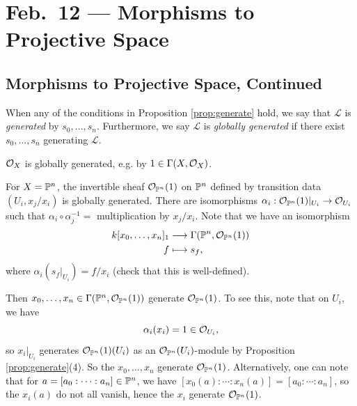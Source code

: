 \chapter{Feb.~12 --- Morphisms to Projective Space}

\section{Morphisms to Projective Space, Continued}

\begin{definition}
  When any of the conditions
  in Proposition \ref{prop:generate} hold, we say that
  $\mathcal{L}$ is \emph{generated}
  by $s_0, \dots, s_n$. Furthermore,
  we say $\mathcal{L}$
  is \emph{globally generated} if
  there exist $s_0, \dots, s_n$ generating
  $\mathcal{L}$.
\end{definition}

\begin{example}
  $\mathcal{O}_X$ is globally generated,
  e.g. by $1 \in \Gamma(X, \mathcal{O}_X)$.
\end{example}

\begin{example}
  For $X = \mathbb{P}^n$, the invertible sheaf
  $\mathcal{O}_{\mathbb{P}^n}(1)$
  on $\mathbb{P}^n$ defined by transition data
  $(U_i, x_j / x_i)$
  is globally generated. There are
  isomorphisms
  $\alpha_{i} : \mathcal{O}_{\mathbb{P}^n}(1)|_{U_i} \to \mathcal{O}_{U_i}$
  such that $\alpha_i \circ \alpha_j^{-1} =$
  multiplication by $x_j / x_i$.
  Note that we have an isomorphism
  \begin{align*}
    k[x_0, \dots, x_n]_1
    &\longrightarrow \Gamma(\mathbb{P}^n, \mathcal{O}_{\mathbb{P}^n}(1)) \\
    f &\longmapsto s_f,
  \end{align*}
  where $\alpha_i(s_f|_{U_i}) = f / x_i$
  (check that this is well-defined).

  Then $x_0, \dots, x_n \in \Gamma(\mathbb{P}^n, \mathcal{O}_{\mathbb{P}^n}(1))$
  generate $\mathcal{O}_{\mathbb{P}^n}(1)$.
  To see this, note that on $U_i$, we have
  \[
    \alpha_i(x_i) = 1 \in \mathcal{O}_{U_i},
  \]
  so $x_i|_{U_i}$ generates
  $\mathcal{O}_{\mathbb{P}^n}(1)(U_i)$ as
  an $\mathcal{O}_{\mathbb{P}^n}(U_i)$-module
  by Proposition \ref{prop:generate}(4).
  So the $x_0, \dots, x_n$
  generate $\mathcal{O}_{\mathbb{P}^n}(1)$. Alternatively,
  one can note that for
  $a = [a_0 : \cdots : a_n] \in \mathbb{P}^n$,
  we have $[x_0(a) : \cdots : x_n(a)] = [a_0 : \cdots : a_n]$,
  so the $x_i(a)$ do not all vanish,
  hence the $x_i$ generate $\mathcal{O}_{\mathbb{P}^n}(1)$.
\end{example}

